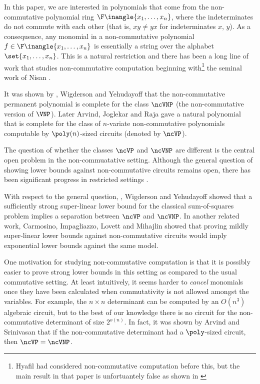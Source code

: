 In this paper, we are interested in polynomials that come from the non-commutative polynomial ring $\F \inangle{x_1, \ldots, x_n}$, where the indeterminates do not commute with each other (that is, $xy \neq yx$ for indeterminates $x$, $y$). 
As a consequence, any monomial in a non-commutative polynomial $f \in \F \inangle{x_1, \ldots, x_n}$ is essentially a string over the alphabet $\set{x_1, \ldots, x_n}$. 
This is a natural restriction and there has been a long line of work that studies non-commutative computation beginning with\footnote{Hyafil \cite{H77} had considered non-commutative computation before this, but the main result in that paper is unfortuantely false as shown in \cite{N91}} the seminal work of Nisan \cite{N91}.

It was shown by \Hrubes, Wigderson and Yehudayoff \cite{HWY10} that the non-commutative permanent polynomial is complete for the class $\ncVNP$ (the non-commutative version of $\VNP$).
Later Arvind, Joglekar and Raja \cite{AJR16} gave a natural polynomial that is complete for the class of $n$-variate non-commutative polynomials computable by $\poly(n)$-sized circuits (denoted by $\ncVP$). 

The question of whether the classes $\ncVP$ and $\ncVNP$ are different is the central open problem in the non-commuatative setting. 
Although the general question of showing lower bounds against non-commutative circuits remains open, there has been significant progress in restricted settings \cite{LMS16,LMP19,LLS19,ST18,FLOS20}.

With respect to the general question, \Hrubes, Wigderson and Yehudayoff \cite{HWY11} showed that a sufficiently strong super-linear lower bound for the classical sum-of-squares problem implies a separation between $\ncVP$ and $\ncVNP$.
In another related work, Carmosino, Impagliazzo, Lovett and Mihajlin \cite{CILM18} showed that proving mildly super-linear lower bounds against non-commutative circuits would imply exponential lower bounds against the same model.

One motivation for studying non-commutative computation is that it is possibly easier to prove strong lower bounds in this setting as compared to the usual commutative setting.
At least intuitively, it seems harder to \emph{cancel} monomials once they have been calculated when commutativity is not allowed amongst the variables. 
For example, the $n \times n$ determinant can be computed by an $O(n^3)$ algebraic circuit, but to the best of our knowledge there is no circuit for the non-commutative determinant of size $2^{o(n)}$. 
In fact, it was shown by Arvind and Srinivasan \cite{AS18} that if the non-commutative determinant had a $\poly$-sized circuit, then $\ncVP = \ncVNP$.

